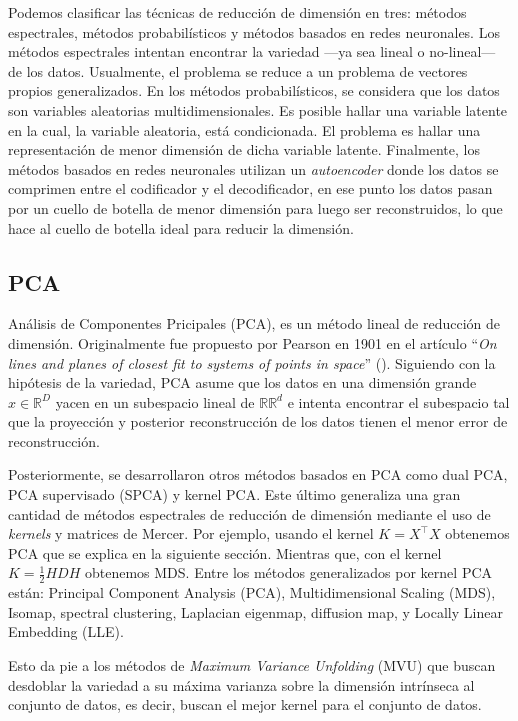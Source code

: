 \documentclass{article}
\numberwithin{equation}{section}
\theoremstyle{remark}
\theoremstyle{definition}
\theoremstyle{remark}
\theoremstyle{remark}
\begin{document}
Podemos clasificar las técnicas de reducción de dimensión en tres: métodos espectrales, métodos probabilísticos y métodos 
basados en redes neuronales.
Los métodos espectrales intentan encontrar la variedad ---ya sea lineal o no-lineal--- de los datos. Usualmente, el problema
se reduce a un problema de vectores propios generalizados.
En los métodos probabilísticos, se considera que los datos son variables aleatorias multidimensionales. Es posible hallar 
una variable latente en la cual, la variable aleatoria, está condicionada. El problema es hallar una representación de menor
dimensión de dicha variable latente.
Finalmente, los métodos basados en redes neuronales utilizan un \textit{autoencoder} donde los datos se comprimen entre el 
codificador y el decodificador, en ese punto los datos pasan por un cuello de botella de menor dimensión para luego ser
reconstruidos, lo que hace al cuello de botella ideal para reducir la dimensión.


\subsection{PCA}
\label{ss:pca}

Análisis de Componentes Pricipales (PCA), es un método lineal de reducción de dimensión. 
Originalmente fue propuesto por Pearson en 1901 en el artículo 
``\textit{On lines and planes of closest fit to systems of points in space}'' (\textcite{Pearson}). 
Siguiendo con la hipótesis de la variedad, PCA asume que los datos en una dimensión grande 
$x \in \mathbb{R}^D$ yacen en un subespacio lineal de $\mathbb{RR}^d$ e intenta encontrar el subespacio 
tal que la proyección y posterior reconstrucción de los datos tienen el menor error de reconstrucción.

Posteriormente, se desarrollaron otros métodos basados en PCA como dual PCA, PCA supervisado (SPCA) y kernel PCA.
Este último generaliza una gran cantidad de métodos espectrales de reducción de dimensión mediante el uso de \textit{kernels} y matrices de Mercer. 
Por ejemplo, usando el kernel $K = X^\intercal X$ obtenemos PCA que se explica en la siguiente sección. Mientras que, con el kernel $K = \frac{1}{2} HDH$ obtenemos MDS.
Entre los métodos generalizados por kernel PCA están: Principal Component Analysis (PCA), Multidimensional Scaling (MDS), Isomap, spectral clustering, 
Laplacian eigenmap, diffusion map, y Locally Linear Embedding (LLE).

Esto da pie a los métodos de \textit{Maximum Variance Unfolding} (MVU) que buscan desdoblar la variedad a su máxima varianza sobre la dimensión intrínseca al conjunto de datos, 
es decir, buscan el mejor kernel para el conjunto de datos.
\end{document}
